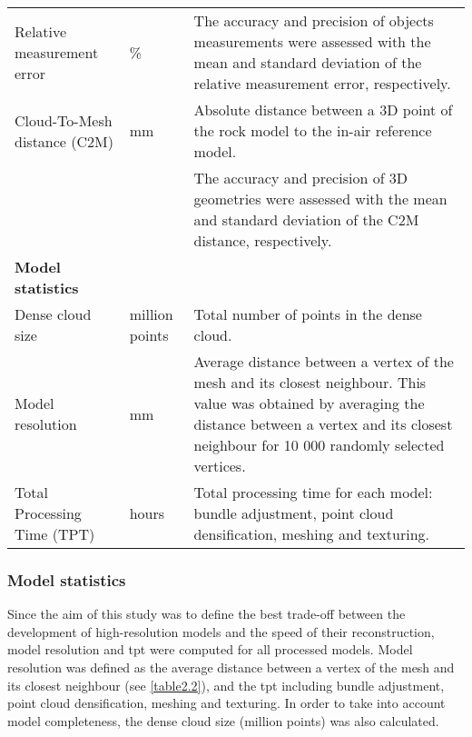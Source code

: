 \begin{table}[H]
{\begin{tabular}{L{4cm} L{1cm}L{10cm}}
Relative measurement error                             & \%             & The accuracy and precision of objects measurements were assessed with the mean and standard deviation of the relative measurement error, respectively. \\
Cloud-To-Mesh distance (C2M)                           & mm             & Absolute distance between a 3D point of the rock model to the in-air reference model. \\
                                                       &                & The accuracy and precision of 3D geometries were assessed with the mean and standard deviation of the C2M distance, respectively. \\
\midrule 
\textbf{Model statistics}                              &                &   \\
\midrule 
Dense cloud size                                       & million points & Total number of points in the dense cloud.\\
Model resolution                                       & mm             & Average distance between a vertex of the mesh and its closest neighbour. This value was obtained by averaging the distance between a vertex and its closest neighbour for 10 000 randomly selected vertices.  \\
Total Processing Time (TPT)                            & hours          & Total processing time for each model: bundle adjustment, point cloud densification, meshing and texturing.\\                                                       \bottomrule
\end{tabular}
    }
\end{table}

\subsubsection{Model statistics}\label{chapitre2_2.3.2}
Since the aim of this study was to define the best trade-off between the development of high-resolution models and the speed of their reconstruction, model resolution and \gls{tpt} were computed for all processed models. Model resolution was defined as the average distance between a vertex of the mesh and its closest neighbour (see \autoref{table2.2}), and the \acrshort{tpt} including bundle adjustment, point cloud densification, meshing and texturing. In order to take into account model completeness, the dense cloud size (million points) was also calculated.

